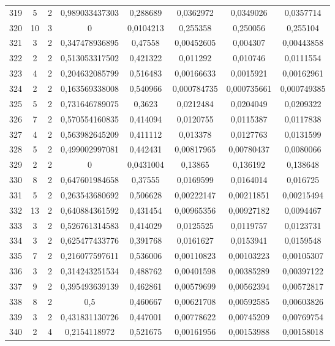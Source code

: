 \begin{longtable}{|c|c|c|c|c|c|c|c|}
319 & 5 & 2 & 0,989033437303 & 0,288689 & 0,0362972 & 0,0349026 & 0,0357714  \\
320 & 10 & 3 & 0 & 0,0104213 & 0,255358 & 0,250056 & 0,255104  \\
321 & 3 & 2 & 0,347478936895 & 0,47558 & 0,00452605 & 0,004307 & 0,00443858  \\
322 & 2 & 2 & 0,513053317502 & 0,421322 & 0,011292 & 0,010746 & 0,0111554  \\
323 & 4 & 2 & 0,204632085799 & 0,516483 & 0,00166633 & 0,0015921 & 0,00162961  \\
324 & 2 & 2 & 0,163569338008 & 0,540966 & 0,000784735 & 0,000735661 & 0,000749385  \\
325 & 5 & 2 & 0,731646789075 & 0,3623 & 0,0212484 & 0,0204049 & 0,0209322  \\
326 & 7 & 2 & 0,570554160835 & 0,414094 & 0,0120755 & 0,0115387 & 0,0117838  \\
327 & 4 & 2 & 0,563982645209 & 0,411112 & 0,013378 & 0,0127763 & 0,0131599  \\
328 & 5 & 2 & 0,499002997081 & 0,442431 & 0,00817965 & 0,00780437 & 0,0080066  \\
329 & 2 & 2 & 0 & 0,0431004 & 0,13865 & 0,136192 & 0,138648  \\
330 & 8 & 2 & 0,647601984658 & 0,37555 & 0,0169599 & 0,0164014 & 0,016725  \\
331 & 5 & 2 & 0,263543680692 & 0,506628 & 0,00222147 & 0,00211851 & 0,00215494  \\
332 & 13 & 2 & 0,640884361592 & 0,431454 & 0,00965356 & 0,00927182 & 0,0094467  \\
333 & 3 & 2 & 0,526761314583 & 0,414029 & 0,0125525 & 0,0119757 & 0,0123731  \\
334 & 3 & 2 & 0,625477433776 & 0,391768 & 0,0161627 & 0,0153941 & 0,0159548  \\
335 & 7 & 2 & 0,216077597611 & 0,536006 & 0,00110823 & 0,00103223 & 0,00105307  \\
336 & 3 & 2 & 0,314243251534 & 0,488762 & 0,00401598 & 0,00385289 & 0,00397122  \\
337 & 9 & 2 & 0,395493639139 & 0,462861 & 0,00579699 & 0,00562394 & 0,00572817  \\
338 & 8 & 2 & 0,5 & 0,460667 & 0,00621708 & 0,00592585 & 0,00603826  \\
339 & 3 & 2 & 0,431831130726 & 0,447001 & 0,00778622 & 0,00745209 & 0,00769754  \\
340 & 2 & 4 & 0,2154118972 & 0,521675 & 0,00161956 & 0,00153988 & 0,00158018  \\

\end{longtable}
